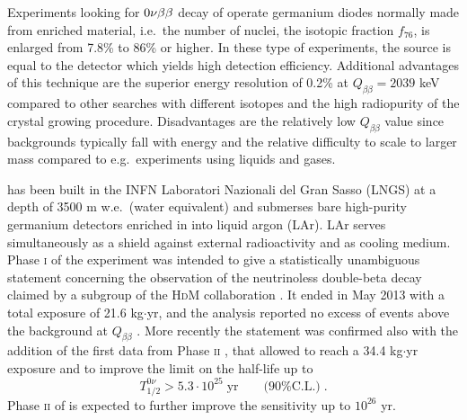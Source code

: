 Experiments looking for $0\nu\beta\beta$ decay of  operate germanium diodes normally made from enriched material, i.e.~the number of  nuclei, the isotopic fraction $f_{76}$, is enlarged from 7.8\% to 86\% or higher. In these type of experiments, the source is equal to the detector which yields high detection efficiency. Additional advantages of this technique are the superior energy resolution of 0.2\% at $Q_{\beta\beta}=2039$ keV compared to other searches with different isotopes and the high radiopurity of the crystal growing procedure. Disadvantages are the relatively low $Q_{\beta\beta}$ value since backgrounds typically fall with energy and the relative difficulty to scale to larger mass compared to e.g.~experiments using liquids and gases.

{\gerda} has been built in the INFN Laboratori Nazionali del Gran Sasso (LNGS) at a depth of 3500 m w.e.~(water equivalent) and submerses bare high-purity germanium detectors enriched in  into liquid argon (LAr). LAr serves simultaneously as a shield against external radioactivity and as cooling medium. Phase \textsc{i} of the experiment was intended to give a statistically unambiguous statement concerning the observation of the neutrinoless double-beta decay claimed by a subgroup of the \textsc{HdM} collaboration \cite{hdmclaim}. It ended in May 2013 with a total exposure of 21.6 kg$\cdot$yr, and the analysis reported no excess of events above the background at $Q_{\beta\beta}$ \cite{resultsphase1}. More recently the statement was confirmed also with the addition of the first data from Phase \textsc{ii} \cite{nature}, that allowed to reach a 34.4 kg$\cdot$yr exposure and to improve the limit on the half-life up to
\begin{equation}T_{1/2}^{0\nu}>5.3\cdot10^{25}\;\text{yr}\qquad\text{(90\% C.L.)}\;.\end{equation}
Phase \textsc{ii} of {\gerda} is expected to further improve the sensitivity up to $10^{26}$ yr.

